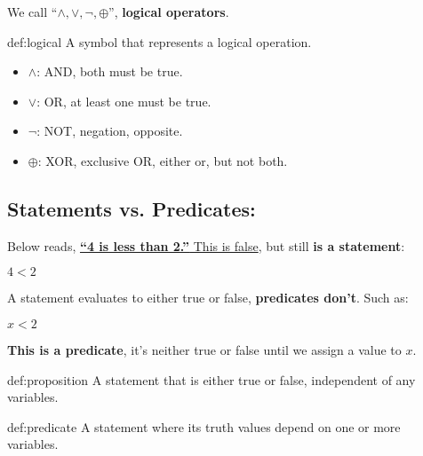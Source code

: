 \noindent
We call ``$\land, \lor, \neg, \oplus$'', \textbf{logical operators}.

\begin{Def}{def:logical}
    A symbol that represents a logical operation.
    \begin{itemize}
        \item $\land$: AND, both must be true.
        \item $\lor$: OR, at least one must be true.
        \item $\neg$: NOT, negation, opposite.
        \item $\oplus$: XOR, exclusive OR, either or, but not both.
    \end{itemize}
\end{Def}

\newpage

\noindent
\subsection{Statements vs. Predicates:}
Below reads, \underline{\textbf{``4 is less than 2.''} This is false}, but still \textbf{is a statement}:
\begin{center}
    \large
    $4<2$
\end{center}
A statement evaluates to either true or false, \textbf{predicates don't}. Such as:
\begin{center}
    \large
    $x<2$
\end{center}
\textbf{This is a predicate}, it's neither true or false until we assign a value to $x$.\\

\begin{Def}[Proposition]{def:proposition}
    A statement that is either true or false, independent of any variables.
\end{Def}
\begin{Def}[Predicate]{def:predicate}
    A statement where its truth values depend on one or more variables.
\end{Def}

